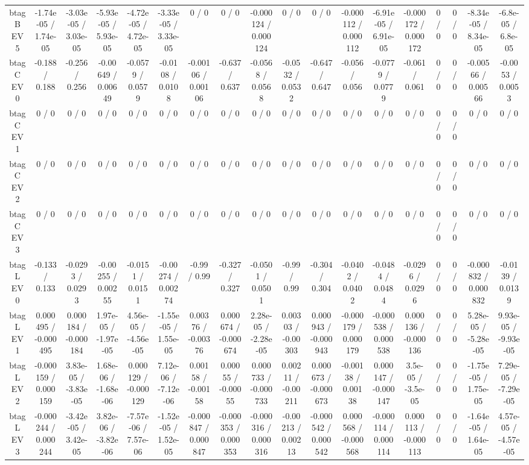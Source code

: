 \documentclass[10pt]{article}
\begin{document}
\begin{table}[htbp]
\begin{center}
\begin{tabular}{|c|c|c|c|c|c|c|c|c|c|c|c|c|c|c|c|c|c|}
  btag B EV 5 & -1.74e-05 / 1.74e-05 & -3.03e-05 / 3.03e-05 & -5.93e-05 / 5.93e-05 & -4.72e-05 / 4.72e-05 & -3.33e-05 / 3.33e-05 & 0 / 0 & 0 / 0 & -0.000124 / 0.000124 & 0 / 0 & 0 / 0 & -0.000112 / 0.000112 & -6.91e-05 / 6.91e-05 & -0.000172 / 0.000172 & 0 / 0 & 0 / 0 & -8.34e-05 / 8.34e-05 & -6.8e-05 / 6.8e-05 \\ 
  btag C EV 0 & -0.188 / 0.188 & -0.256 / 0.256 & -0.00649 / 0.00649 & -0.0579 / 0.0579 & -0.0108 / 0.0108 & -0.00106 / 0.00106 & -0.637 / 0.637 & -0.0568 / 0.0568 & -0.0532 / 0.0532 & -0.647 / 0.647 & -0.056 / 0.056 & -0.0779 / 0.0779 & -0.061 / 0.061 & 0 / 0 & 0 / 0 & -0.00566 / 0.00566 & -0.0053 / 0.0053 \\ 
  btag C EV 1 & 0 / 0 & 0 / 0 & 0 / 0 & 0 / 0 & 0 / 0 & 0 / 0 & 0 / 0 & 0 / 0 & 0 / 0 & 0 / 0 & 0 / 0 & 0 / 0 & 0 / 0 & 0 / 0 & 0 / 0 & 0 / 0 & 0 / 0 \\ 
  btag C EV 2 & 0 / 0 & 0 / 0 & 0 / 0 & 0 / 0 & 0 / 0 & 0 / 0 & 0 / 0 & 0 / 0 & 0 / 0 & 0 / 0 & 0 / 0 & 0 / 0 & 0 / 0 & 0 / 0 & 0 / 0 & 0 / 0 & 0 / 0 \\ 
  btag C EV 3 & 0 / 0 & 0 / 0 & 0 / 0 & 0 / 0 & 0 / 0 & 0 / 0 & 0 / 0 & 0 / 0 & 0 / 0 & 0 / 0 & 0 / 0 & 0 / 0 & 0 / 0 & 0 / 0 & 0 / 0 & 0 / 0 & 0 / 0 \\ 
  btag L EV 0 & -0.133 / 0.133 & -0.0293 / 0.0293 & -0.00255 / 0.00255 & -0.0151 / 0.0151 & -0.00274 / 0.00274 & -0.99 / 0.99 & -0.327 / 0.327 & -0.0501 / 0.0501 & -0.99 / 0.99 & -0.304 / 0.304 & -0.0402 / 0.0402 & -0.0484 / 0.0484 & -0.0296 / 0.0296 & 0 / 0 & 0 / 0 & -0.000832 / 0.000832 & -0.0139 / 0.0139 \\ 
  btag L EV 1 & 0.000495 / -0.000495 & 0.000184 / -0.000184 & 1.97e-05 / -1.97e-05 & 4.56e-05 / -4.56e-05 & -1.55e-05 / 1.55e-05 & 0.00376 / -0.00376 & 0.000674 / -0.000674 & 2.28e-05 / -2.28e-05 & 0.00303 / -0.00303 & 0.000943 / -0.000943 & -0.000179 / 0.000179 & -0.000538 / 0.000538 & 0.000136 / -0.000136 & 0 / 0 & 0 / 0 & 5.28e-05 / -5.28e-05 & 9.93e-05 / -9.93e-05 \\ 
  btag L EV 2 & -0.000159 / 0.000159 & 3.83e-05 / -3.83e-05 & 1.68e-06 / -1.68e-06 & 0.000129 / -0.000129 & 7.12e-06 / -7.12e-06 & 0.00158 / -0.00158 & 0.00055 / -0.00055 & 0.000733 / -0.000733 & 0.00211 / -0.00211 & 0.000673 / -0.000673 & -0.00138 / 0.00138 & 0.000147 / -0.000147 & 3.5e-05 / -3.5e-05 & 0 / 0 & 0 / 0 & -1.75e-05 / 1.75e-05 & 7.29e-05 / -7.29e-05 \\ 
  btag L EV 3 & -0.000244 / 0.000244 & -3.42e-05 / 3.42e-05 & 3.82e-06 / -3.82e-06 & -7.57e-06 / 7.57e-06 & -1.52e-05 / 1.52e-05 & -0.000847 / 0.000847 & -0.000353 / 0.000353 & -0.000316 / 0.000316 & -0.00213 / 0.00213 & -0.000542 / 0.000542 & 0.000568 / -0.000568 & -0.000114 / 0.000114 & 0.000113 / -0.000113 & 0 / 0 & 0 / 0 & -1.64e-05 / 1.64e-05 & 4.57e-05 / -4.57e-05 \\ 

\end{tabular}
\end{center}
\end{table}
\end{document}
